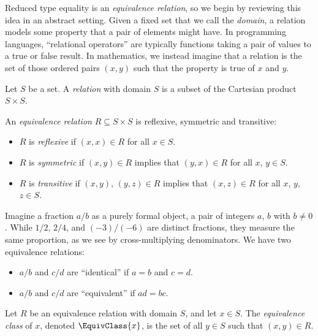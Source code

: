 \documentclass[../generics]{subfiles}
\begin{document}
Reduced type equality is an \emph{equivalence relation}, so we begin by reviewing this idea in an abstract setting. Given a fixed set that we call the \emph{domain}, a relation models some property that a pair of elements might have. In programming languages, ``relational operators'' are typically functions taking a pair of values to a true or false result. In mathematics, we instead imagine that a relation is the set of those ordered pairs $(x,y)$ such that the property is true of $x$ and $y$.

\begin{definition}\label{def relation}
Let $S$ be a set. A \emph{relation} with domain $S$ is a subset of the Cartesian product $S\times S$.
\end{definition}

\begin{definition}
An \emph{equivalence relation} $R\subseteq S\times S$ is reflexive, symmetric and transitive:
\begin{itemize}
\item $R$ is \emph{reflexive} if $(x,x)\in R$ for all $x\in S$.
\item $R$ is \emph{symmetric} if $(x,y)\in R$ implies that $(y,x)\in R$ for all $x$, $y\in S$.
\item $R$ is \emph{transitive} if $(x,y)$, $(y,z)\in R$ implies that $(x,z)\in R$ for all $x$, $y$, $z\in S$.
\end{itemize}
\end{definition}

Imagine a fraction $a/b$ as a purely formal object, a pair of integers $a$, $b$ with $b \neq 0$. While $1/2$, $2/4$, and $(-3)/(-6)$ are distinct fractions, they measure the same proportion, as we see by cross-multiplying denominators. We have two equivalence relations:
\begin{itemize}
\item $a/b$ and $c/d$ are ``identical'' if $a=b$ and $c=d$.
\item $a/b$ and $c/d$ are ``equivalent'' if $ad=bc$.
\end{itemize}

\begin{definition}
Let $R$ be an equivalence relation with domain $S$, and let $x\in S$. The \emph{equivalence class} of $x$, denoted $\EquivClass{x}$, is the set of all $y\in S$ such that $(x, y)\in R$.
\end{definition}
\end{document}
